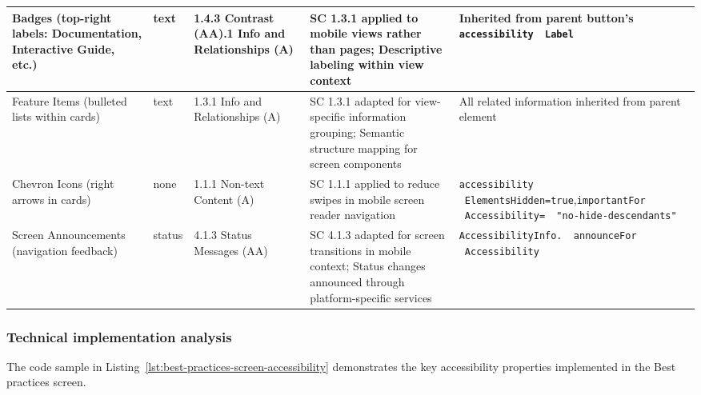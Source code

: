 \begin{longtable}[c]{|C{2.5cm}|C{1.8cm}|C{2.8cm}|C{3.5cm}|C{4.7cm}|}
\hline
Badges (top-right labels: Documentation, Interactive Guide, etc.) & text & 1.4.3 Contrast (AA).1 Info and Relationships (A) & SC 1.3.1 applied to mobile views rather than pages; Descriptive labeling within view context & Inherited from parent button's \texttt{accessibility \ Label} \\
\hline
Feature Items (bulleted lists within cards) & text & 1.3.1 Info and Relationships (A) & SC 1.3.1 adapted for view-specific information grouping; Semantic structure mapping for screen components & All related information inherited from parent element\\
\hline
Chevron Icons (right arrows in cards) & none & 1.1.1 Non-text Content (A) & SC 1.1.1 applied to reduce swipes in mobile screen reader navigation & \texttt{accessibility \ ElementsHidden=true},\newline \texttt{importantFor \ Accessibility= \ "no-hide-descendants"} \\
\hline
Screen Announcements (navigation feedback) & status & 4.1.3 Status Messages (AA) & SC 4.1.3 adapted for screen transitions in mobile context; Status changes announced through platform-specific services & \texttt{AccessibilityInfo. \ announceFor \ Accessibility} \\
\end{longtable}
\FloatBarrier

\subsubsection{Technical implementation analysis}

The code sample in Listing~\ref{lst:best-practices-screen-accessibility} demonstrates the key accessibility properties implemented in the Best practices screen.

